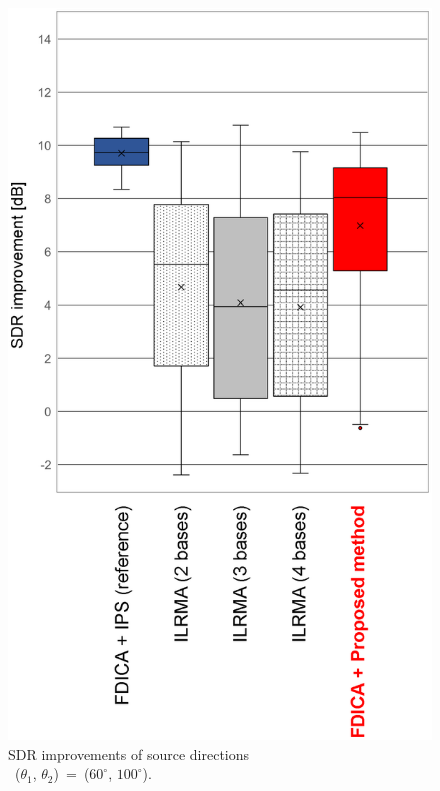 \begin{figure}[th]
    \vspace{4pt}
    \begin{center}
        \includegraphics[width=0.7\columnwidth]{figures/sdr_glaph_060-100.eps}
    \end{center}
    \vspace{-8pt}
	\caption{SDR improvements of source directions\\
	\protect\linebreak~($\theta_1$, $\theta_2$)~=~($60^\circ$, $100^\circ$).}
	\label{fig:060-100}
\end{figure}
